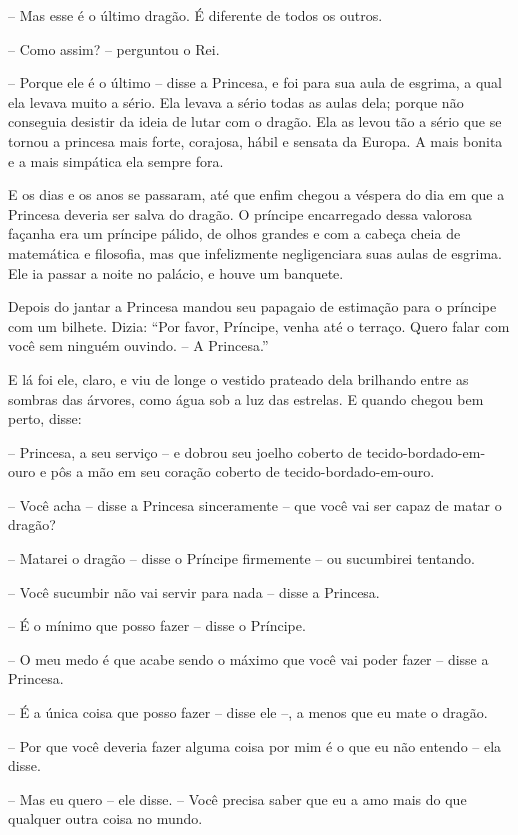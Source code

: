 -- Mas esse é o último dragão. É diferente de todos os outros.

-- Como assim? -- perguntou o Rei.

-- Porque ele é o último -- disse a Princesa, e foi para sua aula de
esgrima, a qual ela levava muito a sério. Ela levava a sério todas as
aulas dela; porque não conseguia desistir da ideia de lutar com o
dragão. Ela as levou tão a sério que se tornou a princesa mais forte,
corajosa, hábil e sensata da Europa. A mais bonita e a mais simpática
ela sempre fora. 

E os dias e os anos se passaram, até que enfim chegou a véspera do dia
em que a Princesa deveria ser salva do dragão. O príncipe encarregado
dessa valorosa façanha era um príncipe pálido, de olhos grandes e com
a cabeça cheia de matemática e filosofia, mas que infelizmente
negligenciara suas aulas de esgrima. Ele ia passar a noite no
palácio, e houve um banquete.

Depois do jantar a Princesa mandou seu papagaio de estimação para o
príncipe com um bilhete. Dizia: “Por favor, Príncipe, venha até o
terraço. Quero falar com você sem ninguém ouvindo. -- A Princesa.”

E lá foi ele, claro, e viu de longe o vestido prateado dela brilhando
entre as sombras das árvores, como água sob a luz das estrelas. E
quando chegou bem perto, disse:

-- Princesa, a seu serviço -- e dobrou seu joelho coberto de
tecido-bordado-em-ouro e pôs a mão em seu coração coberto de
tecido-bordado-em-ouro.

-- Você acha -- disse a Princesa sinceramente -- que você vai ser capaz
de matar o dragão?

-- Matarei o dragão -- disse o Príncipe firmemente -- ou sucumbirei
tentando. 

-- Você sucumbir não vai servir para nada -- disse a Princesa. 

-- É o mínimo que posso fazer -- disse o Príncipe.

-- O meu medo é que acabe sendo o máximo que você vai poder fazer --
disse a Princesa.

-- É a única coisa que posso fazer -- disse ele --, a menos que eu mate o
dragão.

-- Por que você deveria fazer alguma coisa por mim é o que eu não
entendo -- ela disse.

-- Mas eu quero -- ele disse. -- Você precisa saber que eu a amo mais do
que qualquer outra coisa no mundo. 

